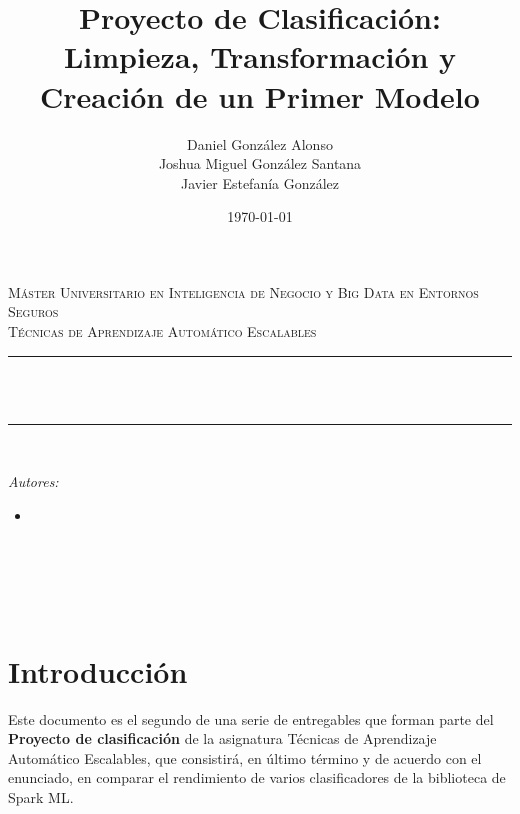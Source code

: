 \documentclass[12pt]{article}
\title{Proyecto de Clasificación: Limpieza, Transformación y Creación de un Primer Modelo}			                %
\author{Daniel González Alonso\\		%
        Joshua Miguel González Santana\\
		Javier Estefanía González}
\date{\today}							%
\makeatletter
\let\thetitle\@title
\let\theauthor\@author
\let\thedate\@date
\makeatother
\begin{document}
\begin{titlepage}
	\centering
    \vspace*{0.25 cm}
	
	\doublespacing
	\textsc{\LARGE Máster Universitario en Inteligencia de Negocio y Big Data en Entornos Seguros}\\[0.5 cm]
	\singlespacing
	\textsc{\large Técnicas de Aprendizaje Automático Escalables}\\[0.5 cm]
	
	\rule{\linewidth}{0.2 mm}\\[0.4 cm]
	\textsc{\huge \bf \thetitle}\\
	\rule{\linewidth}{0.2 mm}\\[2.5 cm]
	
	\begin{minipage}{0.6\textwidth}
		\begin{flushleft} \large
			\emph{Autores:}\\
			\begin{itemize}
            	\item[] \theauthor
            \end{itemize}
		\end{flushleft}
	\end{minipage}~
	\begin{minipage}{0.3\textwidth}
		\begin{flushright} \large
		\end{flushright}
	\end{minipage}\\[6 cm]
	{\large \thedate}\\[2 cm]

	\vfill	
\end{titlepage}

\tableofcontents
\pagebreak

\section{Introducción}
Este documento es el segundo de una serie de entregables que forman parte del \textbf{Proyecto de clasificación} de la asignatura Técnicas de Aprendizaje Automático Escalables, que consistirá, en último término y de acuerdo con el enunciado, en comparar el rendimiento de varios clasificadores de la biblioteca de Spark ML.\\
\end{document}
